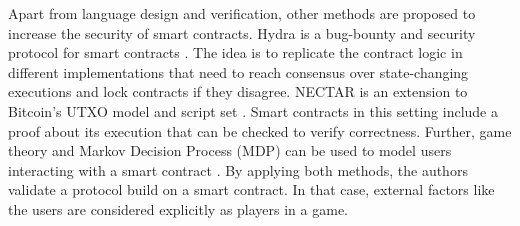 Apart from language design and verification, other methods are proposed to increase the security of smart contracts. Hydra is a bug-bounty and security protocol for smart contracts \cite{Breidenbach2018}. The idea is to replicate the contract logic in different implementations that need to reach consensus over state-changing executions and lock contracts if they disagree.
NECTAR is an extension to Bitcoin's UTXO model and script set \cite{Covaci2018}. Smart contracts in this setting include a proof about its execution that can be checked to verify correctness.
Further, game theory and Markov Decision Process (MDP) can be used to model users interacting with a smart contract \cite{Bigi2015}. By applying both methods, the authors validate a protocol build on a smart contract. In that case, external factors like the users are considered explicitly as players in a game.



